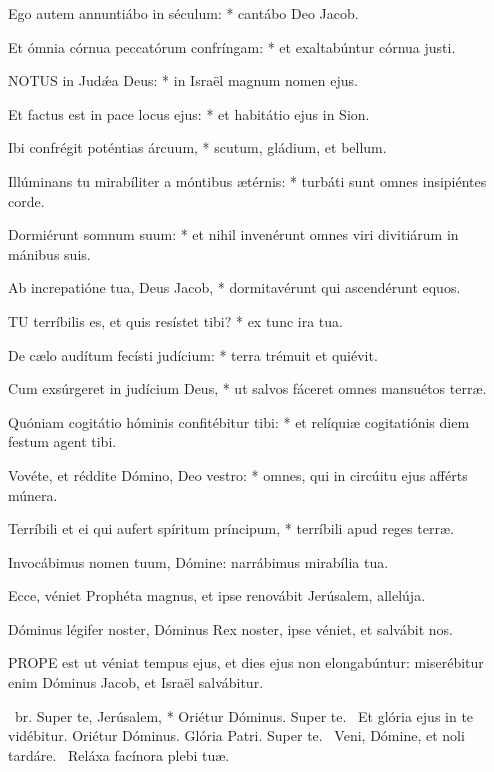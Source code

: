 Ego autem annuntiábo in séculum: * cantábo Deo Jacob.

Et ómnia córnua peccatórum confríngam: * et exaltabúntur córnua justi.


\lettrine[lines=2]{N}{OTUS} in Judǽa Deus: * in Israël magnum nomen ejus.

Et factus est in pace locus ejus: * et habitátio ejus in Sion.

Ibi confrégit poténtias árcuum, * scutum, gládium, et bellum.

Illúminans tu mirabíliter a móntibus ætérnis: * turbáti sunt omnes insipiéntes corde.

Dormiérunt somnum suum: * et nihil invenérunt omnes viri divitiárum in mánibus suis.

Ab increpatióne tua, Deus Jacob, * dormitavérunt qui ascendérunt equos.


\lettrine[lines=2]{T}{U} terríbilis es, et quis resístet tibi? * ex tunc ira tua.

De cælo audítum fecísti judícium: * terra trémuit et quiévit.

Cum exsúrgeret in judícium Deus, * ut salvos fáceret omnes mansuétos terræ.

Quóniam cogitátio hóminis confitébitur tibi: * et relíquiæ cogitatiónis diem festum agent tibi.

Vovéte, et réddite Dómino, Deo vestro: * omnes, qui in circúitu ejus afférts múnera.

Terríbili et ei qui aufert spíritum príncipum, * terríbili apud reges terræ.

  Invocábimus nomen tuum, Dómine: narrábimus mirabília tua.


  Ecce, véniet Prophéta magnus, et ipse renovábit Jerúsalem, allelúja.

  Dóminus légifer noster, Dóminus Rex noster, ipse véniet, et salvábit nos.


\lettrine[lines=2]{P}{ROPE} est ut véniat tempus ejus, et dies ejus non elongabúntur: miserébitur enim Dóminus Jacob, et Israël salvábitur.

\R\ br. Super te, Jerúsalem, * Oriétur Dóminus. Super te. \V\ Et glória ejus in te vidébitur. Oriétur Dóminus. Glória Patri. Super te. \V\ Veni, Dómine, et noli tardáre. \R\ Reláxa facínora plebi tuæ.

